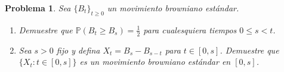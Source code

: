 \documentclass[12pt]{article}
\newtheorem{problem}{Problema}
\begin{document}
\begin{problem}
Sea $\{B_t\}_{t \geq 0}$ un movimiento browniano estándar.
\begin{enumerate}
    \item[(a)] Demuestre que $\mathbb{P}(B_t \geq B_s) = \tfrac{1}{2}$ para cualesquiera tiempos
        $0 \leq s < t$.
    \item[(b)] Sea $s > 0$ fijo y defina $X_t = B_s - B_{s-t}$ para $t \in [0,s]$. Demuestre que
        $\{X_t : t \in [0,s]\}$ es un movimiento browniano estándar en $[0,s]$.
 \end{enumerate}
\end{problem}
\end{document}

